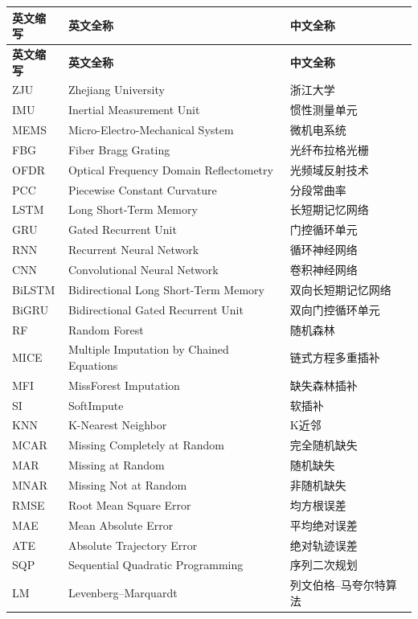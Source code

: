 \cleardoublepage
{}
\begin{center}
    \begin{longtable}{m{1.8cm}m{7.5cm}m{4.7cm}}
        \toprule
        \textbf{英文缩写}&\textbf{英文全称}&\textbf{中文全称}\\
        \midrule
        \endfirsthead
        \toprule
        \textbf{英文缩写}&\textbf{英文全称}&\textbf{中文全称}\\
        \midrule
        \endhead 
        \bottomrule
        \endfoot
        \bottomrule
        \endlastfoot
        ZJU&Zhejiang University&浙江大学\\
        IMU&Inertial Measurement Unit&惯性测量单元\\
        MEMS&Micro-Electro-Mechanical System&微机电系统\\
        FBG&Fiber Bragg Grating&光纤布拉格光栅\\
        OFDR&Optical Frequency Domain Reflectometry&光频域反射技术\\
        PCC&Piecewise Constant Curvature&分段常曲率\\
        LSTM&Long Short-Term Memory&长短期记忆网络\\
        GRU&Gated Recurrent Unit&门控循环单元\\
        RNN&Recurrent Neural Network&循环神经网络\\
        CNN&Convolutional Neural Network&卷积神经网络\\
        BiLSTM&Bidirectional Long Short-Term Memory&双向长短期记忆网络\\
        BiGRU&Bidirectional Gated Recurrent Unit&双向门控循环单元\\
        RF&Random Forest&随机森林\\
        MICE&Multiple Imputation by Chained Equations&链式方程多重插补\\
        MFI&MissForest Imputation&缺失森林插补\\
        SI&SoftImpute&软插补\\
        KNN&K-Nearest Neighbor&K近邻\\
        MCAR&Missing Completely at Random&完全随机缺失\\
        MAR&Missing at Random&随机缺失\\
        MNAR&Missing Not at Random&非随机缺失\\
        RMSE&Root Mean Square Error&均方根误差\\
        MAE&Mean Absolute Error&平均绝对误差\\
        ATE&Absolute Trajectory Error&绝对轨迹误差\\
        SQP&Sequential Quadratic Programming&序列二次规划\\
        LM&Levenberg--Marquardt&列文伯格--马夸尔特算法\\
	\end{longtable}
\end{center}
